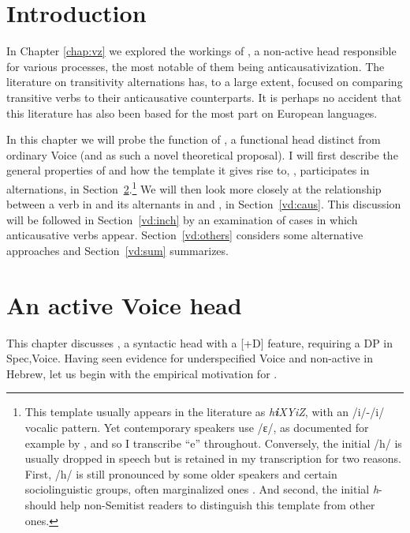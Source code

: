 \label{chap:vd}
\section{Introduction}
In Chapter \ref{chap:vz} we explored the workings of {\vz}, a non-active head responsible for various processes, the most notable of them being anticausativization. The literature on transitivity alternations has, to a large extent, focused on comparing transitive verbs to their anticausative counterparts. It is perhaps no accident that this literature has also been based for the most part on European languages.

In this chapter we will probe the function of {\vd}, a functional head distinct from ordinary Voice (and as such a novel theoretical proposal). I will first describe the general properties of {\vd} and how the template it gives rise to, {\thif}, participates in alternations, in Section~\ref{vd:vd}.\footnote{This template usually appears in the literature as \emph{h\textbf{i}XYiZ}, with an /i/-/i/ vocalic pattern. Yet contemporary speakers use /ɛ/, as documented for example by \cite{trachtman16}, and so I transcribe ``e'' throughout. Conversely, the initial /h/ is usually dropped in speech but is retained in my transcription for two reasons. First, /h/ is still pronounced by some older speakers and certain sociolinguistic groups, often marginalized ones \citep[cf.~][]{schwarzwald81biu,gafter14phd}. And second, the initial \emph{h}- should help non-Semitist readers to distinguish this template from other ones.} We will then look more closely at the relationship between a verb in {\tkal} and its alternants in {\tnif} and {\thif}, in Section~\ref{vd:caus}. This discussion will be followed in Section~\ref{vd:inch} by an examination of cases in which anticausative verbs appear. Section~\ref{vd:others} considers some alternative approaches and Section~\ref{vd:sum} summarizes.

\section{An active Voice head} \label{vd:vd}
This chapter discusses {\vd}, a syntactic head with a [+D] feature, requiring a DP in Spec,Voice. Having seen evidence for underspecified Voice and non-active {\vz} in Hebrew, let us begin with the empirical motivation for {\vd}.

